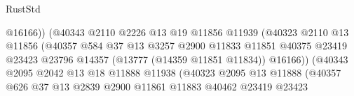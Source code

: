\begin{lexlean}{RustStd}
\begin{coremodule}
                                              @16166))
                                          (@40343
                                            @2110
                                            @2226
                                            @13
                                            @19
                                            @11856
                                            @11939
                                            (@40323
                                              @2110
                                              @13
                                              @11856
                                              (@40357
                                                @584
                                                @37
                                                @13
                                                @3257
                                                @2900
                                                @11833
                                                @11851
                                                @40375
                                                @23419
                                                @23423
                                                @23796
                                                @14357
                                                (@13777 (@14359 @11851 @11834))
                                                @16166))
                                            (@40343
                                              @2095
                                              @2042
                                              @13
                                              @18
                                              @11888
                                              @11938
                                              (@40323
                                                @2095
                                                @13
                                                @11888
                                                (@40357
                                                  @626
                                                  @37
                                                  @13
                                                  @2839
                                                  @2900
                                                  @11861
                                                  @11883
                                                  @40462
                                                  @23419
                                                  @23423

\end{coremodule}
\end{lexlean}
